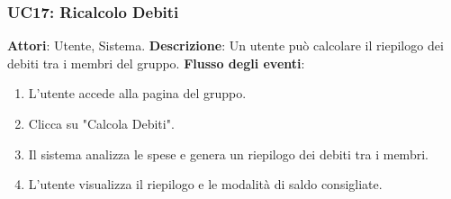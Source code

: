 \subsubsection{UC17: Ricalcolo Debiti}
\textbf{Attori}: Utente, Sistema.
\newline
\newline
\textbf{Descrizione}: Un utente può calcolare il riepilogo dei debiti tra i membri del gruppo.
\newline
\newline
\textbf{Flusso degli eventi}:
\begin{enumerate}
    \item L’utente accede alla pagina del gruppo.
    \item Clicca su "Calcola Debiti".
    \item Il sistema analizza le spese e genera un riepilogo dei debiti tra i membri.
    \item L’utente visualizza il riepilogo e le modalità di saldo consigliate.
\end{enumerate}


